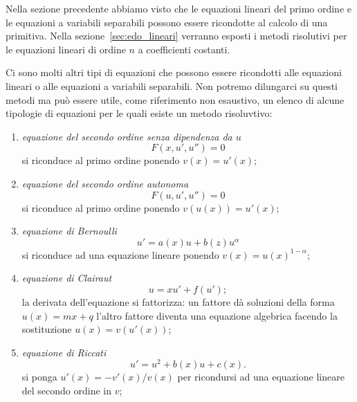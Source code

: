 Nella sezione precedente abbiamo visto che le equazioni lineari del primo ordine
e le equazioni
a variabili separabili possono essere ricondotte al calcolo di una primitiva.
Nella sezione~\ref{sec:edo_lineari} verranno esposti i metodi risolutivi per le
equazioni lineari di ordine $n$ a coefficienti costanti.

Ci sono molti altri tipi di equazioni che possono essere ricondotti
alle equazioni lineari o alle equazioni a variabili separabili.
Non potremo dilungarci su questi metodi ma può essere utile,
come riferimento non esaustivo,
un elenco di alcune tipologie di equazioni per le quali esiste un metodo
risoluvtivo:

\begin{enumerate}
\item \emph{equazione del secondo ordine senza dipendenza da $u$}
\[
  F(x, u', u'') = 0
\]
si riconduce al primo ordine ponendo $v(x)=u'(x)$;
\item \emph{equazione del secondo ordine autonoma}
\[
  F(u, u', u'') = 0
\]
si riconduce al primo ordine
ponendo $v(u(x)) = u'(x)$;
\item \emph{equazione di Bernoulli}
\[
  u' = a(x) u + b(z) u^\alpha
\]
si riconduce ad una equazione lineare ponendo
$v(x) = u(x)^{1-\alpha}$;
\item \emph{equazione di Clairaut}
\[
  u = x u' + f(u');
\]
la derivata dell'equazione si fattorizza: un
fattore dà soluzioni della forma $u(x)=mx+q$ l'altro fattore diventa
una equazione algebrica facendo la sostituzione $u(x) = v(u'(x))$;
\item \emph{equazione di Riccati}
\[
  u' = u^2 + b(x) u + c(x).
\]
si ponga $u'(x) = -v'(x)/v(x)$ per ricondursi ad
una equazione lineare del secondo ordine in $v$;
\end{enumerate}

